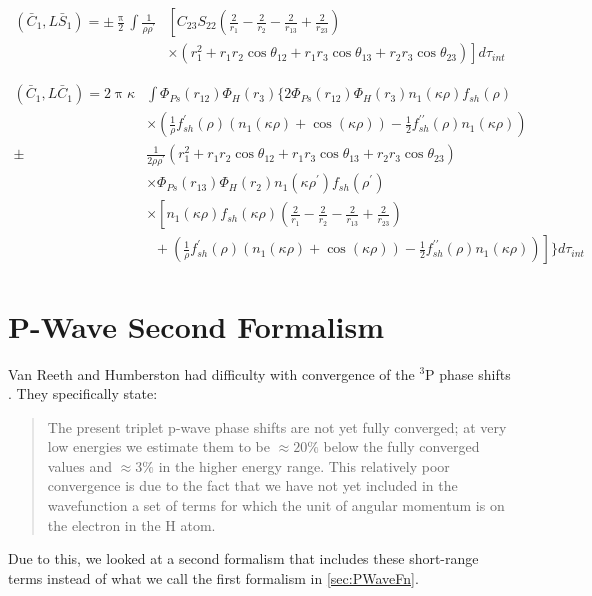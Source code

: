 \documentclass[Dissertation.tex]{subfiles}
\begin{document}
\begin{align}
\label{eq:PWaveCBarSBar}
\left(\bar{C}_1,L\bar{S}_1\right) = \pm \frac{\uppi}{2} \int \frac{1}{\rho\rho^\prime} & \left[C_{23} S_{22} \left(\frac{2}{r_1} - \frac{2}{r_2} - \frac{2}{r_{13}} + \frac{2}{r_{23}} \right) \right.  \nonumber \\
& \left. \times \left(r_1^2 + r_1 r_2 \cos\theta_{12} + r_1 r_3 \cos\theta_{13} + r_2 r_3 \cos\theta_{23} \right) \right] d\tau_{int}
\end{align}

\begin{align}
\label{eq:PWaveCBarCBar}
\nonumber \left(\bar{C}_1,L\bar{C}_1\right) = 2 \uppi \kappa & \int \Phi_{Ps}(r_{12}) \Phi_H(r_3) \Bigg\{ 2 \Phi_{Ps}(r_{12}) \Phi_H(r_3) n_1(\kappa\rho) f_{sh}(\rho) \\
\nonumber & \times \left(\frac{1}{\rho} f_{sh}^\prime(\rho) \left(n_1(\kappa\rho) + \cos(\kappa\rho)\right) - \frac{1}{2} f_{sh}^{\prime\prime}(\rho) n_1(\kappa\rho)\right) \\
\nonumber \pm & \frac{1}{2\rho\rho^\prime} (r_1^2 + r_1 r_2 \cos\theta_{12} + r_1 r_3 \cos\theta_{13} + r_2 r_3 \cos\theta_{23}) \\
\nonumber & \times \Phi_{Ps}(r_{13}) \Phi_H(r_2) n_1(\kappa\rho^\prime) f_{sh}(\rho^\prime) \\
\nonumber & \times \left[ n_1(\kappa\rho) f_{sh}(\kappa\rho) \left(\frac{2}{r_1} - \frac{2}{r_2} - \frac{2}{r_{13}} + \frac{2}{r_{23}} \right) \right. \\
& \; \; + \left. \left(\frac{1}{\rho} f_{sh}^\prime(\rho) \left(n_1(\kappa\rho) + \cos(\kappa\rho)\right) - \frac{1}{2} f_{sh}^{\prime\prime}(\rho)  n_1(\kappa\rho)\right) \right]\Bigg\} d\tau_{int}
\end{align}


\section{P-Wave Second Formalism}
\label{sec:PWave2Formalism}

Van Reeth and Humberston had difficulty with convergence of the $^3$P phase shifts \cite{VanReeth2004}. They specifically state:
\begin{quote}
The present triplet p-wave phase shifts are not yet fully converged; at very low energies we
estimate them to be $\approx 20\%$ below the fully converged values and $\approx 3\%$ in the higher energy range. This relatively poor convergence is due to the fact
that we have not yet included in the wavefunction a set of terms for which the unit of angular momentum is on the electron in the H atom.
\end{quote}
Due to this, we looked at a second formalism that includes these short-range terms instead of what we call the first formalism in \cref{sec:PWaveFn}. 
\end{document}
